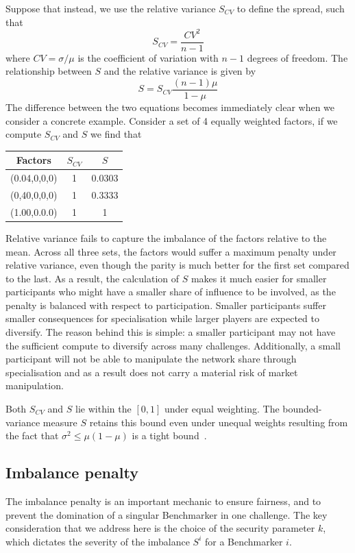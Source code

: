 Suppose that instead, we use the relative variance $S_{CV}$ to define the spread, such that  
\begin{equation}
    S_{CV} = \frac{CV^2}{n - 1}
\end{equation}
where $CV = \sigma/\mu$ is the coefficient of variation with $n-1$ degrees of freedom. 
The relationship between $S$ and the relative variance is given by 
\begin{equation}
    S = S_{CV}\frac{(n-1)\mu}{1 - \mu}
\end{equation}
The difference between the two equations becomes immediately clear when we consider a concrete example.
Consider a set of 4 equally weighted factors, if we compute $S_{CV}$ and $S$ we find that 
\begin{table}[h]
    \centering
    \begin{tabular}{c|cc}
         Factors & $S_{CV}$ & $S$  \\
         \hline
         (0.04,0,0,0) & 1 & 0.0303 \\
         (0,40,0,0,0) & 1 & 0.3333 \\
         (1.00,0.0.0) & 1 & 1
    \end{tabular}
    \label{tab:imbalance-factor-weighting}
\end{table}
Relative variance fails to capture the imbalance of the factors relative to the mean.
Across all three sets, the factors would suffer a maximum penalty under relative variance, even though the parity is much better for the first set compared to the last.
As a result, the calculation of $S$ makes it much easier for smaller participants who might have a smaller share of influence to be involved, as the penalty is balanced with respect to participation. 
Smaller participants suffer smaller consequences for specialisation while larger players are expected to diversify. 
The reason behind this is simple: a smaller participant may not have the sufficient compute to diversify across many challenges. 
Additionally, a small participant will not be able to manipulate the network share through specialisation and as a result does not carry a material risk of market manipulation. 

Both $S_{CV}$ and $S$ lie within the $[0,1]$ under equal weighting. The bounded-variance measure $S$ retains this bound even under unequal weights resulting from the fact that $\sigma^2 \leq \mu(1-\mu)$ is a tight bound~\cite{bhatia2000better}.  


\subsection{Imbalance penalty}
\label{app:imbalance-penalty}
The imbalance penalty is an important mechanic to ensure fairness, and to prevent the domination of a singular Benchmarker in one challenge.
The key consideration that we address here is the choice of the security parameter $k$, which dictates the severity of the imbalance $S^i$ for a Benchmarker $i$. 

